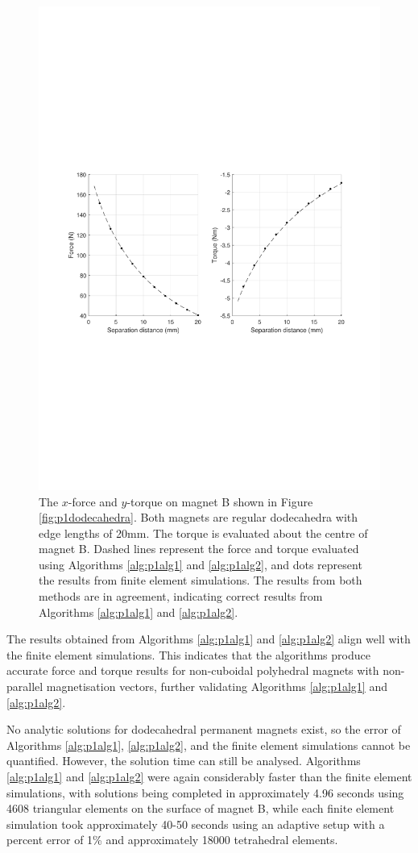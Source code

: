 \begin{figure}
	\centering
	\includegraphics[trim = 3cm 9cm 3cm 9cm,width=0.9\linewidth]{p1/p1FIG6}
	\caption{The \(x\)-force and \(y\)-torque on magnet B shown in Figure \ref{fig:p1dodecahedra}. Both magnets are regular dodecahedra with edge lengths of 20mm. The torque is evaluated about the centre of magnet B. Dashed lines represent the force and torque evaluated using Algorithms \ref{alg:p1alg1} and \ref{alg:p1alg2}, and dots represent the results from finite element simulations. The results from both methods are in agreement, indicating correct results from Algorithms \ref{alg:p1alg1} and \ref{alg:p1alg2}.}
	\label{fig:p1dodecahedraresults}
\end{figure}

The results obtained from Algorithms \ref{alg:p1alg1} and \ref{alg:p1alg2} align well with the finite element simulations. This indicates that the algorithms produce accurate force and torque results for non-cuboidal polyhedral magnets with non-parallel magnetisation vectors, further validating Algorithms \ref{alg:p1alg1} and \ref{alg:p1alg2}.

No analytic solutions for dodecahedral permanent magnets exist, so the error of Algorithms \ref{alg:p1alg1}, \ref{alg:p1alg2}, and the finite element simulations cannot be quantified. However, the solution time can still be analysed. Algorithms \ref{alg:p1alg1} and \ref{alg:p1alg2} were again considerably faster than the finite element simulations, with solutions being completed in approximately 4.96 seconds using 4608 triangular elements on the surface of magnet B, while each finite element simulation took approximately 40-50 seconds using an adaptive setup with a percent error of 1\% and approximately 18000 tetrahedral elements.